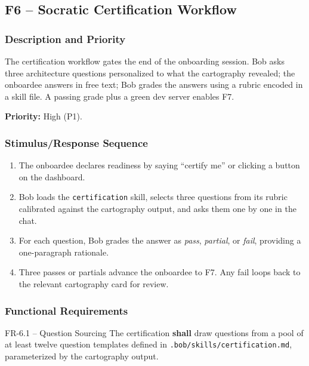\documentclass[11pt,letterpaper]{article}
\newcommand{\shall}{\textbf{shall}}
\begin{document}
\subsection{F6 -- Socratic Certification Workflow}

\subsubsection{Description and Priority}

The certification workflow gates the end of the onboarding session. Bob asks three architecture questions personalized to what the cartography revealed; the onboardee answers in free text; Bob grades the answers using a rubric encoded in a skill file. A passing grade plus a green dev server enables F7.

\textbf{Priority:} High (P1).

\subsubsection{Stimulus/Response Sequence}

\begin{enumerate}
  \item The onboardee declares readiness by saying ``certify me'' or clicking a button on the dashboard.
  \item Bob loads the \texttt{certification} skill, selects three questions from its rubric calibrated against the cartography output, and asks them one by one in the chat.
  \item For each question, Bob grades the answer as \textit{pass}, \textit{partial}, or \textit{fail}, providing a one-paragraph rationale.
  \item Three passes or partials advance the onboardee to F7. Any fail loops back to the relevant cartography card for review.
\end{enumerate}

\subsubsection{Functional Requirements}

\begin{reqbox}{FR-6.1 -- Question Sourcing}
The certification \shall{} draw questions from a pool of at least twelve question templates defined in \texttt{.bob/skills/certification.md}, parameterized by the cartography output.
\end{reqbox}
\end{document}
